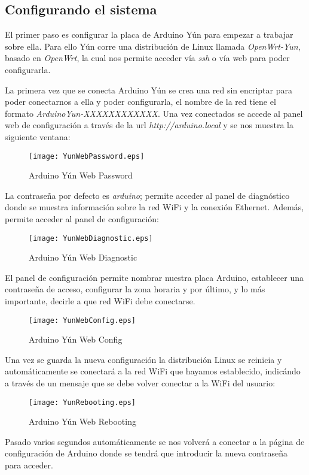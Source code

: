 \subsection{Configurando el sistema}

El primer paso es configurar la placa de Arduino Yún para empezar a trabajar sobre ella. Para ello Yún corre una distribución de Linux llamada \emph{OpenWrt-Yun}, basado en \emph{OpenWrt}, la cual nos permite acceder vía \emph{ssh} o vía web para poder configurarla.

La primera vez que se conecta Arduino Yún se crea una red sin encriptar para poder conectarnos a ella y poder configurarla, el nombre de la red tiene el formato \emph{ArduinoYun-XXXXXXXXXXXX}. Una vez conectados se accede al panel web de configuración a través de la url \emph{http://arduino.local} y se nos muestra la siguiente ventana:

\begin{figure}[H]
    \centering
    \texttt{[image: YunWebPassword.eps]}
    \caption{Arduino Yún Web Password}\label{fig:yun-web-password}
\end{figure}

La contraseña por defecto es \emph{arduino}; permite acceder al panel de diagnóstico donde se muestra información sobre la red WiFi y la conexión Ethernet. Además, permite acceder al panel de configuración:

\begin{figure}[H]
    \centering
    \texttt{[image: YunWebDiagnostic.eps]}
    \caption{Arduino Yún Web Diagnostic}\label{fig:yun-web-diagnostic}
\end{figure}

El panel de configuración permite nombrar nuestra placa Arduino, establecer una contraseña de acceso, configurar la zona horaria y por último, y lo más importante, decirle a que red WiFi debe conectarse.

\begin{figure}[H]
    \centering
    \texttt{[image: YunWebConfig.eps]}
    \caption{Arduino Yún Web Config}\label{fig:yun-web-config}
\end{figure}

Una vez se guarda la nueva configuración la distribución Linux se reinicia y automáticamente se conectará a la red WiFi que hayamos establecido, indicándo a través de un mensaje que se debe volver conectar a la WiFi del usuario:

\begin{figure}[H]
    \centering
    \texttt{[image: YunRebooting.eps]}
    \caption{Arduino Yún Web Rebooting}\label{fig:yun-web-rebooting}
\end{figure}

Pasado varios segundos automáticamente se nos volverá a conectar a la página de configuración de Arduino donde se tendrá que introducir la nueva contraseña para acceder.